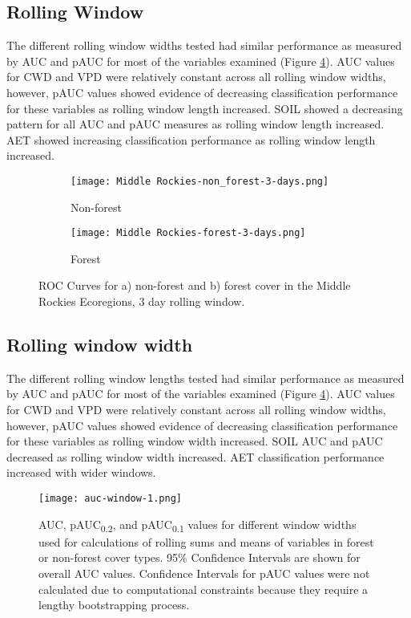 \documentclass[11p]{article}
\newcommand{\pauc}[1]{pAUC\textsubscript{#1}}
\begin{document}
\subsection{Rolling Window}

The different rolling window widths tested had similar performance as measured by AUC and pAUC for most of the variables examined (Figure \ref{fig:auc_window}). AUC values for CWD and VPD were relatively constant across all rolling window widths, however, pAUC values showed evidence of decreasing classification performance for these variables as rolling window length increased.  SOIL showed a decreasing pattern for all AUC and pAUC measures as rolling window length increased.  AET showed increasing classification performance as rolling window length increased.  


\begin{figure}[htbp]
  \centering
  \begin{subfigure}{.5\textwidth}
    \centering
    \texttt{[image: Middle Rockies-non\_forest-3-days.png]}
    \caption{Non-forest}
    \label{fig:mr-nf-auc}
  \end{subfigure}%
  \begin{subfigure}{.5\textwidth}
    \centering
    \texttt{[image: Middle Rockies-forest-3-days.png]}
    \caption{Forest}
    \label{fig:mr-f-auc}
  \end{subfigure}
  \caption{ROC Curves for a) non-forest and b) forest cover in the Middle Rockies Ecoregions, 3 day rolling window.}
  \label{fig:auc}
\end{figure}


\subsection{Rolling window width}

The different rolling window lengths tested had similar performance as measured by AUC and pAUC for most of the variables examined (Figure \ref{fig:auc_window}). AUC values for CWD and VPD were relatively constant across all rolling window widths, however, pAUC values showed evidence of decreasing classification performance for these variables as rolling window width increased. SOIL AUC and pAUC decreased as rolling window width increased. AET classification performance increased with wider windows.

\begin{figure}[htbp]
  \centering
  \texttt{[image: auc-window-1.png]}
  \caption{AUC, \pauc{0.2}, and \pauc{0.1} values for different window widths used for calculations of rolling sums and means of variables in forest or non-forest cover types. 95\% Confidence Intervals are shown for overall AUC values.  Confidence Intervals for pAUC values were not calculated due to computational constraints because they require a lengthy bootstrapping process.}
  \label{fig:auc_window}
\end{figure}
\end{document}
